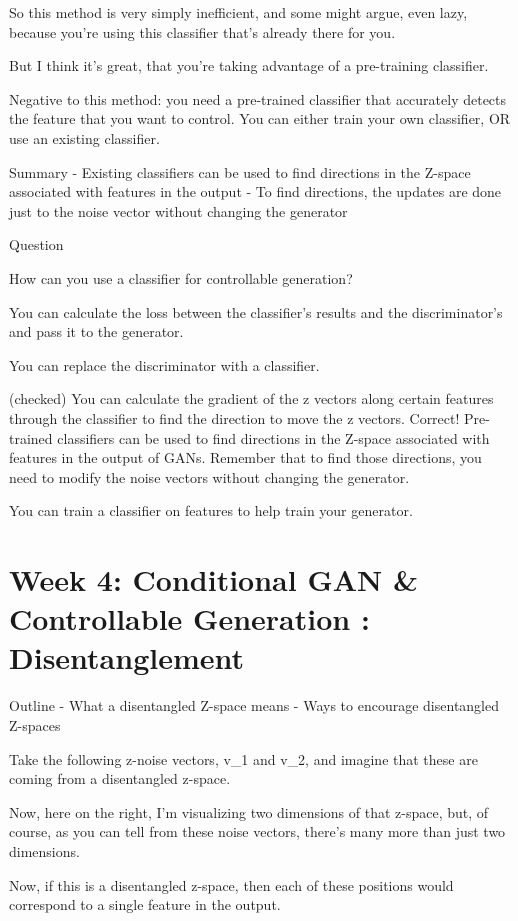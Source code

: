 \documentclass[11pt, onecolumn]{article}
\begin{document}
So this method is very simply inefficient, and some might argue, even lazy,
because you're using this classifier that's already there for you.

But I think it's great, that you're taking advantage of a pre-training classifier.

Negative to this method: you need a pre-trained classifier that accurately detects the feature that you want to control. You can either train your own classifier, OR use an existing classifier.

Summary
- Existing classifiers can be used to find directions in the Z-space associated with features in the output 
- To find directions, the updates are done just to the noise vector without changing the generator

Question

How can you use a classifier for controllable generation?

You can calculate the loss between the classifier’s results and the discriminator’s and pass it to the generator.

You can replace the discriminator with a classifier.

(checked) You can calculate the gradient of the z vectors along certain features through the classifier to find the direction to move the z vectors.
Correct! Pre-trained classifiers can be used to find directions in the Z-space associated with features in the output of GANs. Remember that to find those directions, you need to modify the noise vectors without changing the generator.

You can train a classifier on features to help train your generator.


\section{Week 4: Conditional GAN \& Controllable Generation : Disentanglement}

Outline
- What a disentangled Z-space means
- Ways to encourage disentangled Z-spaces

Take the following z-noise vectors, v_1 and v_2, and imagine that these are coming from a disentangled z-space.

Now, here on the right, I'm visualizing two dimensions of that z-space, but,
of course, as you can tell from these noise vectors, there's many more than just two dimensions.

Now, if this is a disentangled z-space, then each of these positions would
correspond to a single feature in the output.
\end{document}
